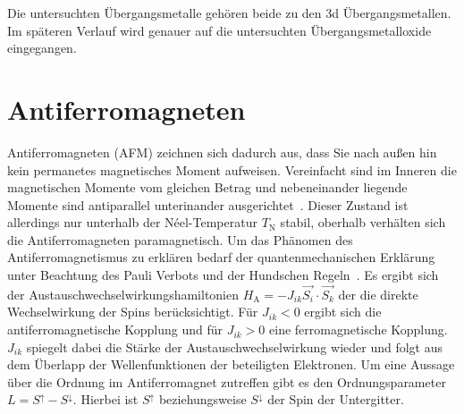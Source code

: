         Die untersuchten Übergangsmetalle gehören beide zu den 3d Übergangsmetallen.
        Im späteren Verlauf wird genauer auf die untersuchten Übergangsmetalloxide eingegangen.

    
    \section{Antiferromagneten}
        Antiferromagneten (AFM) zeichnen sich dadurch aus, dass Sie nach außen hin kein permanetes magnetisches Moment aufweisen.
        Vereinfacht sind im Inneren die magnetischen Momente vom gleichen Betrag und nebeneinander liegende Momente sind antiparallel unterinander ausgerichtet~\cite{Suter}.
        Dieser Zustand ist allerdings nur unterhalb der Néel-Temperatur $T_\text{N}$ stabil, oberhalb verhälten sich die Antiferromagneten paramagnetisch.
        Um das Phänomen des Antiferromagnetismus zu erklären bedarf der quantenmechanischen Erklärung unter Beachtung des Pauli Verbots und der Hundschen Regeln~\cite{TUChemnitz}.
        Es ergibt sich der Austauschwechselwirkungshamiltonien $H_\text{A} = - J_{ik} \vec{S_i}\cdot\vec{S_k}$ der die direkte Wechselwirkung der Spins berücksichtigt.
        Für $J_{ik} < 0$ ergibt sich die antiferromagnetische Kopplung und für $J_{ik} > 0$ eine ferromagnetische Kopplung.
        $J_{ik}$ spiegelt dabei die Stärke der Austauschwechselwirkung wieder und folgt aus dem Überlapp der Wellenfunktionen der beteiligten Elektronen.
        Um eine Aussage über die Ordnung im Antiferromagnet zutreffen gibt es den Ordnungsparameter $L = S^{\uparrow} - S^{\downarrow}$.
        Hierbei ist $S^{\uparrow}$ beziehungsweise $S^{\downarrow}$ der Spin der Untergitter.

